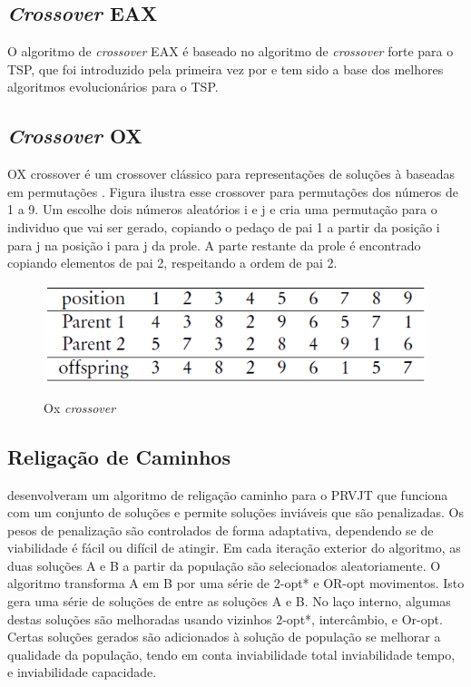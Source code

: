 \subsection{\textit{Crossover} EAX}

 O algoritmo de \textit{crossover} EAX é baseado no algoritmo de \textit{crossover} forte para o TSP, que foi introduzido pela primeira vez por  \cite{nagata06} e tem sido a base dos melhores algoritmos evolucionários para o TSP.
 
 
\subsection{\textit{Crossover} OX}

OX crossover é um  crossover clássico para representações de soluções à baseadas em permutações \cite{falkenauer91}. Figura ilustra esse crossover para permutações dos números de 1 a 9. Um escolhe dois números aleatórios i e j e cria uma permutação para o individuo que vai ser gerado, copiando o pedaço de pai 1 a partir da posição i para j na posição i para j da prole. A parte restante da prole é encontrado copiando elementos de pai 2, respeitando a ordem de pai 2.
 
 
 
\begin{figure}[ht!]
\centering
\includegraphics[scale=0.8]{figuras/ox-crossover.PNG}
\label{ox-crossover}
\caption{Ox \textit{crossover}}
\end{figure}
 
\subsection{Religação de Caminhos}



\cite{hashimoto08} desenvolveram um algoritmo de religação caminho para o PRVJT que funciona com um conjunto de soluções e permite soluções inviáveis que são penalizadas. Os pesos de penalização são controlados de forma adaptativa, dependendo se de viabilidade é fácil ou difícil de atingir. Em cada iteração exterior do algoritmo, as duas soluções A e B a partir da população são selecionados aleatoriamente. O algoritmo transforma A em B por uma série de 2-opt* e OR-opt movimentos. Isto gera uma série de soluções de entre as soluções A e B. No laço interno, algumas destas soluções são melhoradas usando vizinhos 2-opt*, intercâmbio, e Or-opt. Certas soluções gerados são adicionados à solução de população se melhorar a qualidade da população, tendo em conta inviabilidade total inviabilidade tempo, e inviabilidade capacidade.
 

